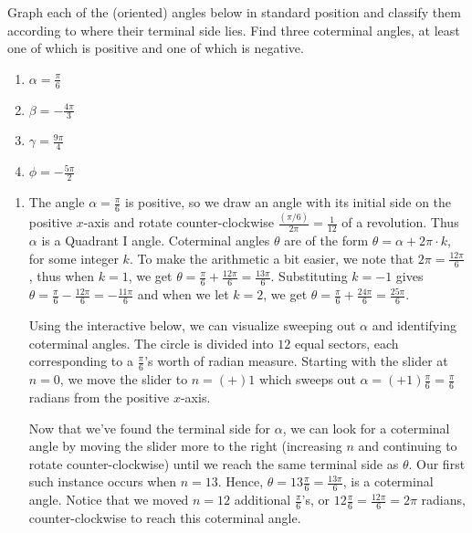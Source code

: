 \documentclass{ximera}
\begin{document}
\begin{example}  \label{orientedcoterminalradian} Graph each of the (oriented) angles below in standard position  and classify them according to where their terminal side lies. Find three coterminal angles, at least one of which is positive and one of which is negative.

\begin{enumerate}

\item  $\alpha = \frac{\pi}{6}$

\item  $\beta = -\frac{4\pi}{3}$

\item  $\gamma = \frac{9 \pi}{4}$

\item  $\phi = - \frac{5 \pi}{2}$

\end{enumerate}

\begin{explanation}  

\begin{enumerate}

\item  The angle $\alpha = \frac{\pi}{6}$ is positive, so we draw an angle with its initial side on the positive $x$-axis and rotate counter-clockwise $\frac{\left( \pi / 6\right)}{2 \pi} = \frac{1}{12}$ of a revolution.  Thus $\alpha$ is a Quadrant I angle. Coterminal angles $\theta$ are of the form $\theta = \alpha + 2\pi \cdot k$, for some integer $k$. To make the arithmetic a bit easier, we note that $2\pi = \frac{12 \pi}{6}$, thus when $k = 1$, we get $\theta =  \frac{\pi}{6} + \frac{12 \pi}{6} = \frac{13 \pi}{6}$.   Substituting $k = -1$ gives $\theta = \frac{\pi}{6} - \frac{12 \pi}{6} = -\frac{11 \pi}{6}$ and when we let $k = 2$, we get $\theta =  \frac{\pi}{6} + \frac{24 \pi}{6} = \frac{25 \pi}{6}$. 

Using the interactive below, we can visualize sweeping out $\alpha$ and identifying coterminal angles.  The circle is divided into $12$ equal sectors, each corresponding to a $\frac{\pi}{6}$'s worth of radian measure.  Starting with the slider at $n = 0$, we move the slider to $n = (+) 1$ which sweeps out $\alpha = (+1) \frac{\pi}{6} = \frac{\pi}{6}$ radians from the positive $x$-axis.  

Now that we've found the terminal side for $\alpha$,  we can look for a coterminal angle by moving the slider more to the right (increasing $n$ and continuing to rotate counter-clockwise) until we reach the same terminal side as $\theta$. Our first such instance occurs when $n=13$.  Hence,  $\theta = 13 \frac{\pi}{6} = \frac{13 \pi}{6}$, is a coterminal angle. Notice that we moved $n = 12$ additional $\frac{\pi}{6}$'s, or $12 \frac{\pi}{6} = \frac{12\pi}{6} = 2\pi$ radians, counter-clockwise to reach this coterminal angle.


\end{enumerate}
\end{explanation}
\end{example}
\end{document}
